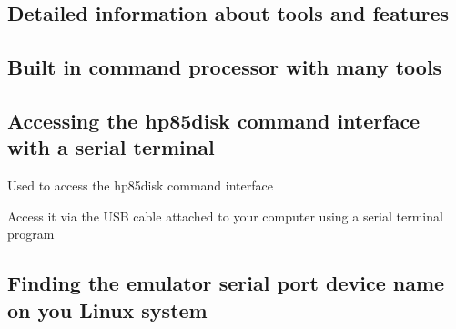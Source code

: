 \subsection*{Detailed information about tools and features}

\subsection*{Built in command processor with many tools}

\subsection*{Accessing the hp85disk command interface with a serial terminal}


\begin{DoxyItemize}
\item Used to access the hp85disk command interface
\item Access it via the U\+SB cable attached to your computer using a serial terminal program
\end{DoxyItemize}

\subsection*{Finding the emulator serial port device name on you Linux system}


